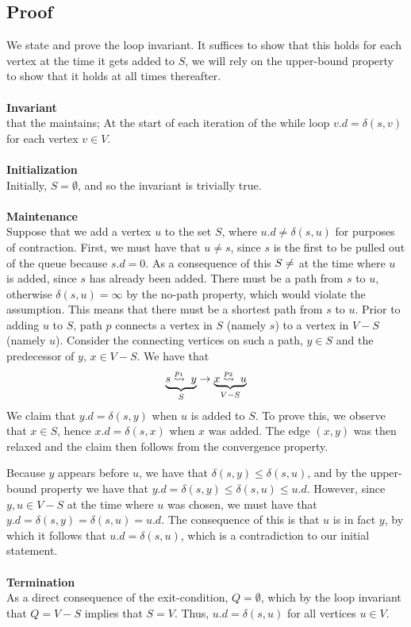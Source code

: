 \subsection{Proof}
We state and prove the loop invariant. It suffices to show that this holds for
each vertex at the time it gets added to $S$, we will rely on the upper-bound
property to show that it holds at all times thereafter.
\\\\
\noindent \textbf{Invariant} \\
that the maintains; At the start of each iteration of the while loop
$v.d = \delta(s, v)$ for each vertex $v \in V$.
\\\\
\noindent \textbf{Initialization} \\
Initially, $S = \emptyset$, and so the invariant is trivially true.
\\\\
\noindent \textbf{Maintenance} \\
Suppose that we add a vertex $u$ to the set $S$, where $u.d \neq \delta(s, u)$
for purposes of contraction. First, we must have that $u \neq s$, since $s$ is
the first to be pulled out of the queue because $s.d = 0$. As a consequence of
this $S \neq \empty$ at the time where $u$ is added, since $s$ has already
been added. There must be a path from $s$ to $u$, otherwise $\delta(s, u) =
\infty$ by the no-path property, which would violate the assumption. This
means that there must be a shortest path from $s$ to $u$. Prior to adding $u$
to $S$, path $p$ connects a vertex in $S$ (namely $s$) to a vertex in $V - S$
(namely $u$). Consider the connecting vertices on such a path, $y \in S$ and
the predecessor of $y$, $x \in V - S$. We have that
\begin{align}
	\underbrace{s \buildrel{p_1}\over\leadsto\; y}_{S}
	\rightarrow
	\underbrace{x \buildrel{p_2}\over\leadsto\; u}_{V - S} \nonumber
\end{align}
We claim that $y.d = \delta(s, y)$ when $u$ is added to $S$. To prove this, we
observe that $x \in S$, hence $x.d = \delta(s, x)$ when $x$ was added. The
edge $(x, y)$ was then relaxed and the claim then follows from the convergence
property.

Because $y$ appears before $u$, we have that $\delta(s, y) \leq \delta(s, u)$,
and by the upper-bound property we have that $y.d = \delta(s, y) \leq
\delta(s, u) \leq u.d$. However, since $y, u \in V - S$ at the time where $u$
was chosen, we must have that $y.d = \delta(s, y) = \delta(s, u) = u.d$. The
consequence of this is that $u$ is in fact $y$, by which it follows that
$u.d = \delta(s, u)$, which is a contradiction to our initial statement.
\\\\
\noindent \textbf{Termination} \\
As a direct consequence of the exit-condition, $Q = \emptyset$, which by the
loop invariant that $Q = V - S$ implies that $S = V$. Thus, $u.d =
\delta(s, u)$ for all vertices $u \in V$.


